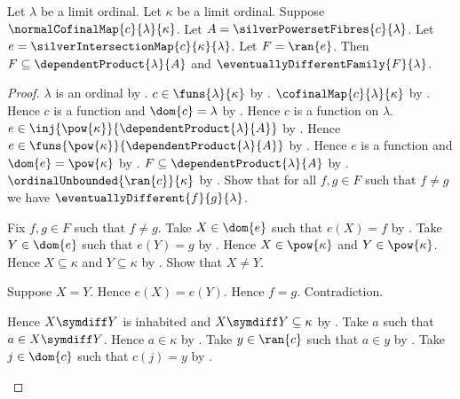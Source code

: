 \begin{theorem}\label{silver_intersection_range_is_eventually_different}
    Let $\lambda$ be a limit ordinal.
    Let $\kappa$ be a limit ordinal.
    Suppose $\normalCofinalMap{c}{\lambda}{\kappa}$.
    Let $A=\silverPowersetFibres{c}{\lambda}$.
    Let $e=\silverIntersectionMap{c}{\kappa}{\lambda}$.
    Let $F=\ran{e}$.
    Then $F\subseteq\dependentProduct{\lambda}{A}$ and
        $\eventuallyDifferentFamily{F}{\lambda}$.
\end{theorem}
\begin{proof}
    $\lambda$ is an ordinal by .
    $c\in\funs{\lambda}{\kappa}$ by .
    $\cofinalMap{c}{\lambda}{\kappa}$
        by .
    Hence $c$ is a function and $\dom{c}=\lambda$
        by .
    Hence $c$ is a function on $\lambda$.
    $e\in\inj{\pow{\kappa}}{\dependentProduct{\lambda}{A}}$
        by .
    Hence $e\in\funs{\pow{\kappa}}{\dependentProduct{\lambda}{A}}$
        by .
    Hence $e$ is a function and $\dom{e}=\pow{\kappa}$
        by .
    $F\subseteq\dependentProduct{\lambda}{A}$ by .
    $\ordinalUnbounded{\ran{c}}{\kappa}$
        by .
    Show that for all $f,g\in F$ such that $f\neq g$ we have
        $\eventuallyDifferent{f}{g}{\lambda}$.
    \begin{subproof}
        Fix $f,g\in F$ such that $f\neq g$.
        Take $X\in\dom{e}$ such that $e(X)=f$
            by .
        Take $Y\in\dom{e}$ such that $e(Y)=g$
            by .
        Hence $X\in\pow{\kappa}$ and $Y\in\pow{\kappa}$.
        Hence $X\subseteq\kappa$ and $Y\subseteq\kappa$
            by .
        Show that $X\neq Y$.
        \begin{subproof}
            Suppose $X=Y$.
            Hence $e(X)=e(Y)$.
            Hence $f=g$.
            Contradiction.
        \end{subproof}
        Hence $X\symdiff Y$ is inhabited and
            $X\symdiff Y\subseteq\kappa$
            by .
        Take $a$ such that $a\in X\symdiff Y$.
        Hence $a\in\kappa$ by .
        Take $y\in\ran{c}$ such that $a\in y$
            by .
        Take $j\in\dom{c}$ such that $c(j)=y$
            by .

\end{subproof}
\end{proof}
